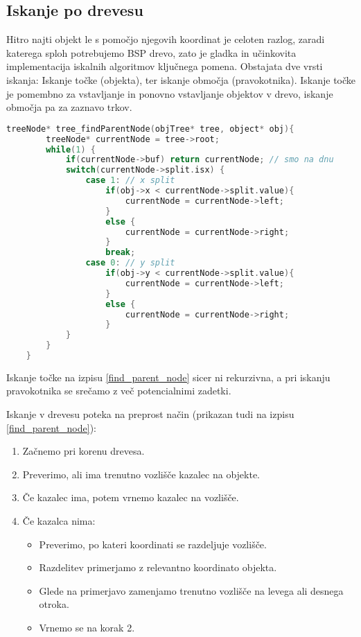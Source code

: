\documentclass[a4paper,12pt]{article}
\begin{document}
\subsection{Iskanje po drevesu}

Hitro najti objekt le s pomočjo njegovih koordinat je celoten razlog, zaradi katerega
sploh potrebujemo BSP drevo, zato je gladka in učinkovita implementacija iskalnih algoritmov
ključnega pomena. Obstajata dve vrsti iskanja:
Iskanje točke (objekta), ter iskanje območja (pravokotnika). Iskanje točke je pomembno za
vstavljanje in ponovno vstavljanje objektov v drevo, iskanje območja pa za zaznavo trkov.

\begin{lstlisting}[float, caption={Iskanje vozlišča, ki vsebuje objekt}, label=find_parent_node, language=C]
    treeNode* tree_findParentNode(objTree* tree, object* obj){
        treeNode* currentNode = tree->root;
        while(1) {
            if(currentNode->buf) return currentNode; // smo na dnu
            switch(currentNode->split.isx) {
                case 1: // x split
                    if(obj->x < currentNode->split.value){
                        currentNode = currentNode->left;
                    }
                    else {
                        currentNode = currentNode->right;
                    }
                    break;
                case 0: // y split
                    if(obj->y < currentNode->split.value){
                        currentNode = currentNode->left;
                    }
                    else {
                        currentNode = currentNode->right;
                    }
            }
        }
    }
\end{lstlisting}
Iskanje točke na izpisu \ref{find_parent_node} sicer ni rekurzivna, a pri
iskanju pravokotnika se srečamo z več potencialnimi zadetki.
\begin{samepage}
    Iskanje v drevesu poteka na preprost način (prikazan tudi na izpisu \ref{find_parent_node}):
    \begin{enumerate}
        \item Začnemo pri korenu drevesa.
        \item Preverimo, ali ima trenutno vozlišče kazalec na objekte.
        \item Če kazalec ima, potem vrnemo kazalec na vozlišče.
        \item Če kazalca nima:
        \begin{itemize}
            \item Preverimo, po kateri koordinati se razdeljuje vozlišče.
            \item Razdelitev primerjamo z relevantno koordinato objekta.
            \item Glede na primerjavo zamenjamo trenutno vozlišče na levega ali desnega otroka.
            \item Vrnemo se na korak 2.
        \end{itemize}    
    \end{enumerate}
\end{samepage}
\end{document}
